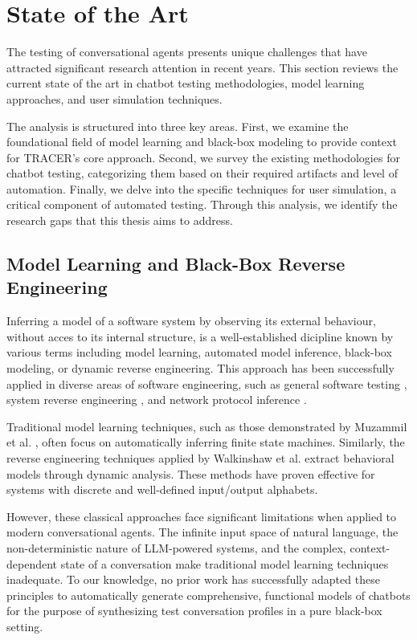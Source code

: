 \section{State of the Art}\label{sec:sota}

The testing of conversational agents presents unique challenges
that have attracted significant research attention in recent years.
This section reviews the current state of the art in
chatbot testing methodologies, model learning approaches, and user simulation techniques.

The analysis is structured into three key areas.
First, we examine the foundational field of model learning
and black-box modeling to provide context for TRACER's core approach.
Second, we survey the existing methodologies for chatbot testing,
categorizing them based on their required artifacts and level of automation.
Finally, we delve into the specific techniques for user simulation,
a critical component of automated testing.
Through this analysis, we identify the research gaps that this thesis aims to address.

\subsection{Model Learning and Black-Box Reverse Engineering}

Inferring a model of a software system by observing its external behaviour,
without acces to its internal structure,
is a well-established dicipline known by various terms including
model learning, automated model inference, black-box modeling, or dynamic reverse engineering.
This approach has been successfully applied in diverse areas of software engineering,
such as general software testing \autocite{aichernigModelLearningModelBased2018},
system reverse engineering \autocite{hajipourIReEnReverseEngineeringBlackBox2021, menguyBlackboxCodeAnalysis2023},
and network protocol inference \autocite{luoDynPREProtocolReverse}.

Traditional model learning techniques,
such as those demonstrated by Muzammil et al. \autocite{shahbazAnalysisTestingBlackbox2014},
often focus on automatically inferring finite state machines.
Similarly, the reverse engineering techniques applied by Walkinshaw et al. \autocite{walkinshawReverseEngineeringSoftwareBehavior2013}
extract behavioral models through dynamic analysis.
These methods have proven effective for systems with discrete and well-defined input/output alphabets.

However, these classical approaches
face significant limitations when applied to modern conversational agents.
The infinite input space of natural language,
the non-deterministic nature of \ac{LLM}-powered systems,
and the complex, context-dependent state of a conversation
make traditional model learning techniques inadequate.
To our knowledge,
no prior work has successfully adapted these principles
to automatically generate comprehensive, functional models of chatbots
for the purpose of synthesizing test conversation profiles
in a pure black-box setting.

